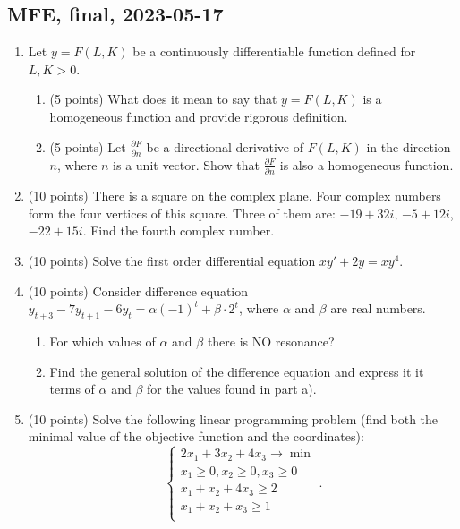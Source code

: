 \subsection{MFE, final, 2023-05-17}
\begin{enumerate}
\item Let $y=F(L,K)$ be a continuously differentiable function defined for $L,K>0$.
    \begin{enumerate}
        \item (5 points) What does it mean to say that $y=F(L,K)$ is a homogeneous function and provide rigorous definition.
        \item (5 points) Let  $\frac{\partial F}{\partial n}$ be a directional derivative of $F(L,K)$  in the direction  $n$, where $n$  is a unit vector. Show that  $\frac{\partial F}{\partial n}$   is also a homogeneous function.
    \end{enumerate}


\item (10 points) There is a square on the complex plane. 
Four complex numbers form the four vertices of this square. 
Three of them are:  $-19+32i$,  $-5+12i$,  $-22+15i$. Find the fourth complex number.


\item (10 points) Solve the first order differential equation $xy'+2y=xy^4$.


\item (10 points) Consider difference equation $y_{t+3}-7y_{t+1}-6y_{t}=\alpha (-1)^t+\beta \cdot 2^t$, where $\alpha$ and $\beta$ are real numbers.
\begin{enumerate}
    \item For which values of $\alpha$ and $\beta$ there is NO resonance?
    \item Find the general solution of the difference equation and express it it terms of $\alpha$ and $\beta$ for the values found in part a).
\end{enumerate}


\item (10 points) Solve the following linear programming problem (find both the minimal value of the objective function and the coordinates):
  \[
  \begin{cases}
  2x_1 + 3x_2 + 4x_3 \to \min \\
  x_1 \geq 0, x_2 \geq 0, x_3 \geq 0 \\
  x_1 + x_2 + 4x_3 \geq 2 \\
  x_1 + x_2 + x_3 \geq 1 \\
  \end{cases}.
  \]
  



\end{enumerate}
